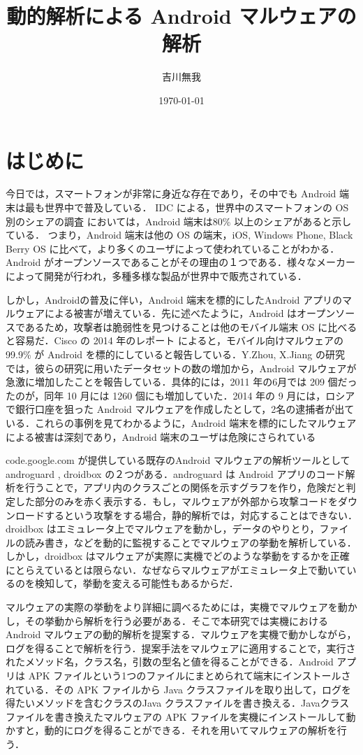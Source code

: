 \documentclass[10pt]{jsarticle}
\title{動的解析による Android マルウェアの解析}
\author{吉川無我}
\date{\today}
\begin{document}
\maketitle
\newpage
\tableofcontents


\newpage
\section{はじめに}
今日では，スマートフォンが非常に身近な存在であり，その中でも Android 端末は最も世界中で普及している． IDC による，世界中のスマートフォンの OS 別のシェアの調査 \cite{osshare} においては，Android 端末は80\% 以上のシェアがあると示している． つまり，Android 端末は他の OS の端末，iOS, Windows Phone, Black Berry OS に比べて，より多くのユーザによって使われていることがわかる．Android がオープンソースであることがその理由の１つである．様々なメーカーによって開発が行われ，多種多様な製品が世界中で販売されている．

しかし，Androidの普及に伴い，Android 端末を標的にしたAndroid アプリのマルウェアによる被害が増えている．先に述べたように，Android はオープンソースであるため，攻撃者は脆弱性を見つけることは他のモバイル端末 OS に比べると容易だ．Cisco の 2014 年のレポート \cite{cisco} によると，モバイル向けマルウェアの 99.9\% が Android を標的にしていると報告している．Y.Zhou, X.Jiang の研究 \cite{dissect} では，彼らの研究に用いたデータセットの数の増加から，Android マルウェアが急激に増加したことを報告している．具体的には，2011 年の6月では 209 個だったのが，同年 10 月には 1260 個にも増加していた．2014 年の 9 月には，ロシアで銀行口座を狙った Android マルウェアを作成したとして，2名の逮捕者が出ている．これらの事例を見てわかるように，Android 端末を標的にしたマルウェアによる被害は深刻であり，Android 端末のユーザは危険にさられている

code.google.com が提供している既存のAndroid マルウェアの解析ツールとして androguard \cite{aguard} , droidbox \cite{dbox} の２つがある．androguard は Android アプリのコード解析を行うことで，アプリ内のクラスごとの関係を示すグラフを作り，危険だと判定した部分のみを赤く表示する．もし，マルウェアが外部から攻撃コードをダウンロードするという攻撃をする場合，静的解析では，対応することはできない．droidbox はエミュレータ上でマルウェアを動かし，データのやりとり，ファイルの読み書き，などを動的に監視することでマルウェアの挙動を解析している．しかし，droidbox はマルウェアが実際に実機でどのような挙動をするかを正確にとらえているとは限らない．なぜならマルウェアがエミュレータ上で動いているのを検知して，挙動を変える可能性もあるからだ．

マルウェアの実際の挙動をより詳細に調べるためには，実機でマルウェアを動かし，その挙動から解析を行う必要がある．そこで本研究では実機における Android マルウェアの動的解析を提案する．マルウェアを実機で動かしながら，ログを得ることで解析を行う．提案手法をマルウェアに適用することで，実行されたメソッド名，クラス名，引数の型名と値を得ることができる．Android アプリは APK ファイルという1つのファイルにまとめられて端末にインストールされている．その APK ファイルから Java クラスファイルを取り出して，ログを得たいメソッドを含むクラスのJava クラスファイルを書き換える．Javaクラスファイルを書き換えたマルウェアの APK ファイルを実機にインストールして動かすと，動的にログを得ることができる．それを用いてマルウェアの解析を行う．
\end{document}

